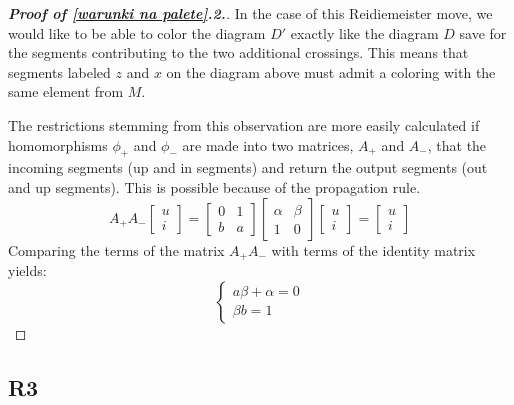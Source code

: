 \begin{proof}[{\bfseries Proof of \cref{warunki na palete}.2.}]
In the case of this Reidiemeister move, we would like to be able to color the diagram $D'$ exactly like the diagram $D$ save for the segments contributing to the two additional crossings. This means that segments labeled $z$ and $x$ on the diagram above must admit a coloring with the same element from $M$.

The restrictions stemming from this observation are more easily calculated if homomorphisms $\phi_+$ and $\phi_-$ are made into two matrices, $A_+$ and $A_-$, that the incoming segments (up and in segments) and return the output segments (out and up segments). This is possible because of the propagation rule.
$$
A_+A_-\begin{bmatrix}u\\i\end{bmatrix}=\begin{bmatrix}
  0 & 1 \\ 
  b & a
  \end{bmatrix}\begin{bmatrix}
  \alpha & \beta \\ 
  1 & 0
\end{bmatrix}
\begin{bmatrix}
  u \\ i 
  \end{bmatrix}=\begin{bmatrix}u\\i\end{bmatrix}
$$
Comparing the terms of the matrix $A_+A_-$ with terms of the identity matrix yields:
$$\begin{cases}
  a\beta+\alpha =0 \\ 
  \beta b=1
\end{cases}$$

\end{proof}

\subsection*{\centering R3}

